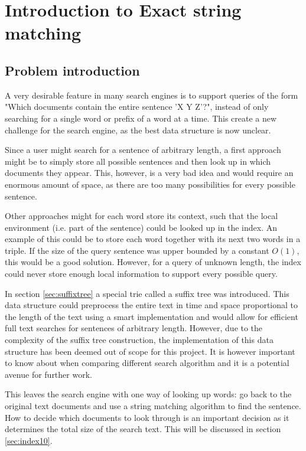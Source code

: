 \section{Introduction to Exact string matching}

\subsection{Problem introduction}

A very desirable feature in many search engines is to support queries of the form "Which documents contain the entire sentence 'X Y Z'?", instead of only searching for a single word or prefix of a word at a time. This create a new challenge for the search engine, as the best data structure is now unclear. 

Since a user might search for a sentence of arbitrary length, a first approach might be to simply store all possible sentences and then look up in which documents they appear. This, however, is a very bad idea and would require an enormous amount of space, as there are too many possibilities for every possible sentence. 

Other approaches might for each word store its context, such that the local environment (i.e. part of the sentence) could be looked up in the index. An example of this could be to store each word together with its next two words in a triple. If the size of the query sentence was upper bounded by a constant $O(1)$, this would be a good solution. However, for a query of unknown length, the index could never store enough local information to support every possible query. 

In section \ref{sec:suffixtree} a special trie called a suffix tree was introduced. This data structure could preprocess the entire text in time and space proportional to the length of the text using a smart implementation and would allow for efficient full text searches for sentences of arbitrary length. However, due to the complexity of the suffix tree construction, the implementation of this data structure has been deemed out of scope for this project. It is however important to know about when comparing different search algorithm and it is a potential avenue for further work. 

This leaves the search engine with one way of looking up words: go back to the original text documents and use a string matching algorithm to find the sentence. How to decide which documents to look through is an important decision as it determines the total size of the search text. This will be discussed in section \ref{sec:index10}. 

